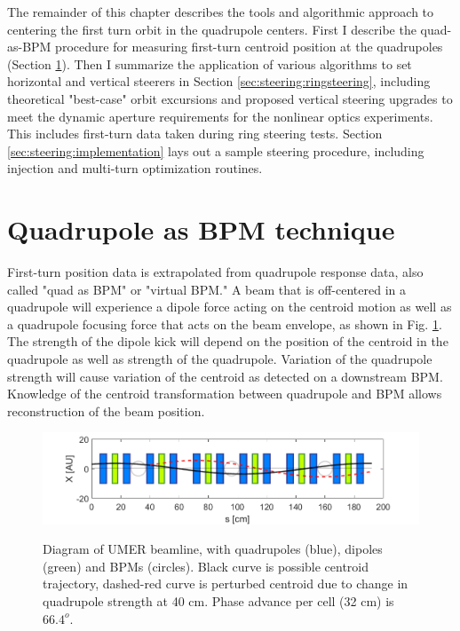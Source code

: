 The remainder of this chapter describes the tools and algorithmic approach to centering the first turn orbit in the quadrupole centers. First I describe the quad-as-BPM procedure for measuring first-turn centroid position at the quadrupoles (Section \ref{sec:steering:quad-as-bpm}). Then I summarize the application of various algorithms to set horizontal and vertical steerers in Section \ref{sec:steering:ringsteering}, including theoretical "best-case" orbit excursions and proposed vertical steering upgrades to meet the dynamic aperture requirements for the nonlinear optics experiments. This includes first-turn data taken during ring steering tests.
Section \ref{sec:steering:implementation} lays out a sample steering procedure, including injection and multi-turn optimization routines. 



 

\section{Quadrupole as BPM technique} \label{sec:steering:quad-as-bpm}

First-turn position data is extrapolated from quadrupole response data, also called "quad as BPM" or "virtual BPM." A beam that is off-centered in a quadrupole will experience a dipole force acting on the centroid motion as well as a quadrupole focusing force that acts on the beam envelope, as shown in Fig. \ref{fig:simple-beamline}. The strength of the dipole kick will depend on the position of the centroid in the quadrupole as well as strength of the quadrupole. Variation of the quadrupole strength will cause variation of the centroid as detected on a downstream BPM. Knowledge of the centroid transformation between quadrupole and BPM allows reconstruction of the beam position. 


\begin{figure}
\begin{center}
\includegraphics[width=\textwidth]{6.figures/simple_beamline.png}
\end{center}
\renewcommand{\baselinestretch}{1}
\small\normalsize
\begin{quote}
\caption[]{Diagram of UMER beamline, with quadrupoles (blue), dipoles (green) and BPMs (circles). Black curve is possible centroid trajectory, dashed-red curve is perturbed centroid due to change in quadrupole strength at 40 cm. Phase advance per cell (32 cm) is $66.4^o$.}
\label{fig:simple-beamline}
\end{quote}
\end{figure} 
\renewcommand{\baselinestretch}{2}
\small\normalsize




